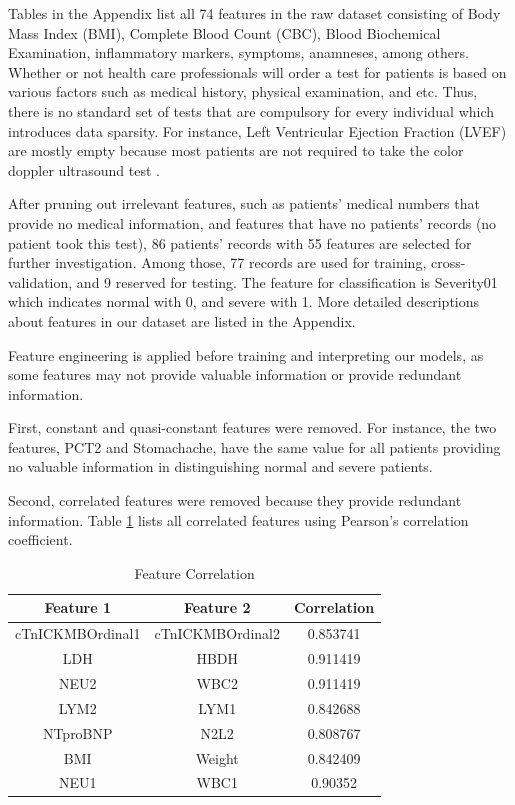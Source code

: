 Tables in the Appendix list all 74 features in the raw dataset consisting of Body Mass Index (BMI), Complete Blood Count (CBC), Blood Biochemical Examination, inflammatory markers, symptoms, anamneses, among others. Whether or not health care professionals will order a test for patients is based on various factors such as medical history, physical examination, and etc. Thus, there is no standard set of tests that are compulsory for every individual which introduces data sparsity. For instance, Left Ventricular Ejection Fraction (LVEF) are mostly empty because most patients are not required to take the color doppler ultrasound test .

\color{black}
After pruning out irrelevant features, such as patients' medical numbers that provide no medical information, and features that have no patients' records (no patient took this test), 86 patients' records with 55 features are selected for further investigation. Among those, 77 records are used for training, cross-validation, and 9 reserved for testing. The feature for classification is Severity01 which indicates normal with 0, and severe with 1. More detailed descriptions about features in our dataset are listed in the Appendix.

Feature engineering is applied before training and interpreting our models, as some features may not provide valuable information or provide redundant information.

First, constant and quasi-constant features were removed. For instance, the two features, PCT2 and Stomachache, have the same value for all patients providing no valuable information in distinguishing normal and severe patients.


Second, correlated features were removed because they provide redundant information. Table \ref{tab:feature_correlation} lists all correlated features using Pearson’s correlation coefficient. 


\begin{table}[H]
\centering
\begin{tabular}{@{}ccc@{}}
\toprule
Feature 1    & Feature 2 & Correlation\\ \midrule
cTnICKMBOrdinal1 & cTnICKMBOrdinal2             & 0.853741       \\
LDH & HBDH             &  0.911419   \\
NEU2           & WBC2             &  0.911419  \\
LYM2       & LYM1             & 0.842688    \\ 
NTproBNP       & N2L2             & 0.808767   \\ 
BMI       & Weight             & 0.842409    \\  
NEU1       & WBC1             & 0.90352    \\  \bottomrule
\end{tabular}
\caption{Feature Correlation}
\label{tab:feature_correlation}
\end{table}



